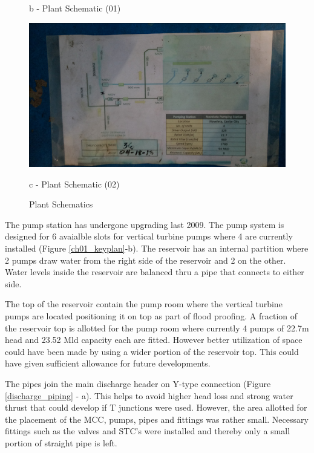 \begin{figure} [!htb]
\begin{minipage}[b]{0.3\linewidth}
		\caption*{b - Plant Schematic (01)}
	\end{minipage}
	\hspace{0.05cm}
	\begin{minipage}[b]{0.3\linewidth}
		\centering
		\includegraphics[width=\textwidth]{figures/fig_ch043_plant_layout2}
		\caption*{c - Plant Schematic (02)}
	\end{minipage}
\caption{Plant Schematics}
\label{plant_schematic}
\end{figure}

The pump station has undergone upgrading last 2009. The pump system is designed for 6 avaialble slots for vertical turbine pumps where 4 are currently installed (Figure \ref{ch01_keyplan}-b). The reservoir has an internal partition where 2 pumps draw water from the right side of the reservoir and 2 on the other. Water levels inside the reservoir are balanced thru a pipe that connects to either side. 

The top of the reservoir contain the pump room where the vertical turbine pumps are located positioning it on top as part of flood proofing. A fraction of the reservoir top is allotted for the pump room where currently 4 pumps of 22.7m head and 23.52 Mld capacity each are fitted. However better utilization of space could have been made by using a wider portion of the reservoir top. This could have given sufficient allowance for future developments.



The pipes join the main discharge header on Y-type connection (Figure \ref{discharge_piping} - a). This helps to avoid higher head loss and strong water thrust that could develop if T junctions were used. However, the area allotted for the placement of the MCC, pumps, pipes and fittings was rather small. Necessary fittings such as the valves and STC’s were installed and thereby only a small portion of straight pipe is left.

